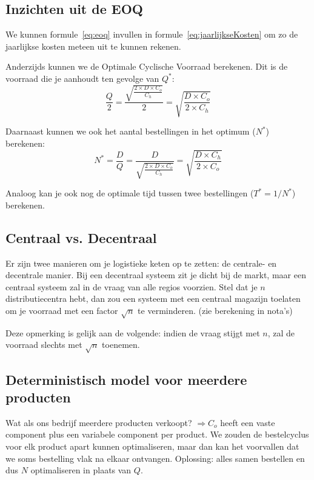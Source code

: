 \subsection{Inzichten uit de EOQ}
We kunnen formule~\ref{eq:eoq} invullen in formule~\ref{eq:jaarlijkseKosten} om zo de jaarlijkse kosten meteen uit te kunnen rekenen.

Anderzijds kunnen we de Optimale Cyclische Voorraad berekenen. Dit is de voorraad die je aanhoudt ten gevolge van $Q^*$:
\begin{equation}
    \frac{Q}{2} = \frac{\sqrt{\frac{2 \times D \times C_o}{C_h}}}{2} = \sqrt{\frac{D \times C_o}{2 \times C_h}}
\end{equation}

Daarnaast kunnen we ook het aantal bestellingen in het optimum ($N^*$) berekenen:
\begin{equation}
    N^* = \frac{D}{Q} = \frac{D}{\sqrt{\frac{2 \times D \times C_o}{C_h}}} = \sqrt{\frac{D \times C_h}{2 \times C_o}}
\end{equation}

Analoog kan je ook nog de optimale tijd tussen twee bestellingen ($T^* = 1 / N^*$) berekenen.

\subsection{Centraal vs. Decentraal}
Er zijn twee manieren om je logistieke keten op te zetten: de centrale- en decentrale manier. Bij een decentraal systeem zit je dicht bij de markt, maar een centraal systeem zal in de vraag van alle regios voorzien. Stel dat je $n$ distributiecentra hebt, dan zou een systeem met een centraal magazijn toelaten om je voorraad met een factor $\sqrt{n}$ te verminderen. (zie berekening in nota's)

Deze opmerking is gelijk aan de volgende: indien de vraag stijgt met $n$, zal de voorraad slechts met $\sqrt{n}$ toenemen.

\subsection{Deterministisch model voor meerdere producten}
Wat als ons bedrijf meerdere producten verkoopt? $\Rightarrow C_o$ heeft een vaste component plus een variabele component per product. We zouden de bestelcyclus voor elk product apart kunnen optimaliseren, maar dan kan het voorvallen dat we soms bestelling vlak na elkaar ontvangen. Oplossing: alles samen bestellen en dus $N$ optimaliseren in plaats van $Q$.


